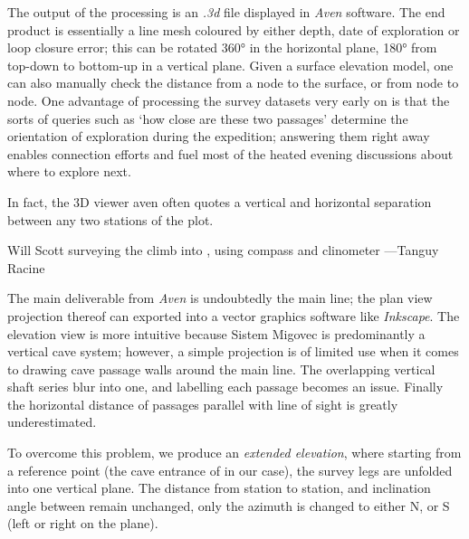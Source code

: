 The output of the processing is an \emph{.3d} file displayed in \emph{Aven} software. The end product is essentially a line mesh coloured by either depth, date of exploration or loop closure error; this can be rotated 360° in the horizontal plane, 180° from top-down to bottom-up in a vertical plane. Given a surface elevation model, one can also manually check the distance from a node to the surface, or from node to node. One advantage of processing the survey datasets very early on is that the sorts of queries such as `how close are these two passages' determine the orientation of exploration during the expedition; answering them right away enables connection efforts and fuel most of the heated evening discussions about where to explore next.

In fact, the 3D viewer aven often quotes a vertical and horizontal separation between any two stations of the plot.

\begin{marginfigure}
\checkoddpage \ifoddpage \forcerectofloat \else \forceversofloat \fi
\centering
 \caption{Will Scott surveying the climb into \protect{}, using compass and clinometer ---Tanguy Racine}
 \label{surveying colony}
\end{marginfigure}

The main deliverable from \emph{Aven} is undoubtedly the main line; the plan view projection thereof can exported into a vector graphics software like \emph{Inkscape}. The elevation view is more intuitive because Sistem Migovec is predominantly a vertical cave system; however, a simple projection is of limited use when it comes to drawing cave passage walls around the main line. The overlapping vertical shaft series blur into one, and labelling each passage becomes an issue. Finally the horizontal distance of passages parallel with line of sight is greatly underestimated.

To overcome this problem, we produce an \emph{extended elevation}, where starting from a reference point (the cave entrance of  in our case), the survey legs are unfolded into one vertical plane. The distance from station to station, and inclination angle between remain unchanged, only the azimuth is changed to either N, or S (left or right on the plane). 

\begin{marginfigure}
 \checkoddpage \ifoddpage \forcerectofloat \else \forceversofloat \fi
 \centering
\end{marginfigure}

